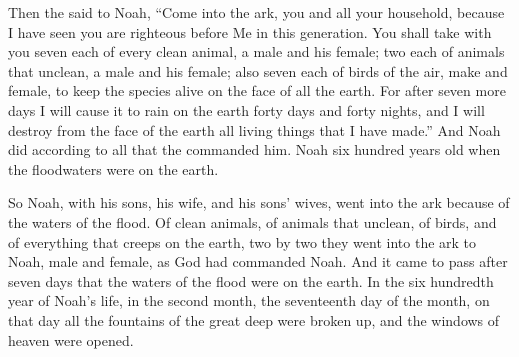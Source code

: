 
\bverse Then the \lord said to Noah, ``Come into the ark, you and all your household, because I have seen \that you are righteous before Me in this generation.
\bverse You shall take with you seven each of every clean animal, a male and his female; two each of animals that \are unclean, a male and his female;
\bverse also seven each of birds of the air, make and female, to keep the species alive on the face of all the earth.
\bverse For after seven more days I will cause it to rain on the earth forty days and forty nights, and I will destroy from the face of the earth all living things that I have made.''
\bverse And Noah did according to all that the \lord commanded him.
\bverse Noah \was six hundred years old when the floodwaters were on the earth.

\bverse So Noah, with his sons, his wife, and his sons' wives, went into the ark because of the waters of the flood.
\bverse Of clean animals, of animals that \are unclean, of birds, and of everything that creeps on the earth,
\bverse two by two they went into the ark to Noah, male and female, as God had commanded Noah.
\bverse And it came to pass after seven days that the waters of the flood were on the earth.
\bverse In the six hundredth year of Noah's life, in the second month, the seventeenth day of the month, on that day all the fountains of the great deep were broken up, and the windows of heaven were opened.

